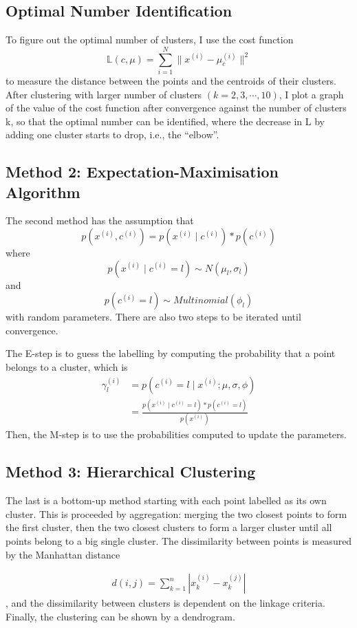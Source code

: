 \documentclass[11pt]{report}
\begin{document}
\subsection{Optimal Number Identification}
To figure out the optimal number of clusters, I use the cost function 
\[
     \mathbb{L}(c,\mu)=\sum_{i=1}^N \lVert x^{(i)}-\mu_c^{(i)}\rVert^2
\]   to measure the distance between the points and the centroids of their clusters. After clustering with larger number of clusters $(k=2,3,\cdots ,10)$,  I plot a graph of the value of the cost function after convergence against the number of clusters k, so that the optimal number can be identified, where the decrease in L by adding one cluster starts to drop, i.e., the “elbow”.

\subsection{Method 2: Expectation-Maximisation Algorithm}

The second method has the assumption that 
\[
     p(x^{(i)},c^{(i)})=p(x^{(i)}\mid c^{(i)})*p(c^{(i)}) 
\]
where 
\[
     p(x^{(i)}\mid c^{(i)}=l) \sim N(\mu_l, \sigma_l)
\] 
and 
\[
     p(c^{(i)}=l) \sim Multinomial(\phi_l ) 
\]
with random parameters. There are also two steps to be iterated until convergence. 

The E-step is to guess the labelling by computing the probability that a point belongs to a cluster, which is 
\begin{align*}
     \gamma_l^{(i)}&=p(c^{(i)}= l\mid x^{(i)} ;{\mu},{\sigma},{\phi})\\
     &=\frac{p(x^{(i)}\mid c^{(i)} = l)*p(c^{(i)}=l)}{p(x^{(i)})}
\end{align*}
Then, the M-step is to use the probabilities computed to update the parameters.

\subsection{Method 3: Hierarchical Clustering}
The last is a bottom-up method starting with each point labelled as its own cluster. This is proceeded by aggregation: merging the two closest points to form the first cluster, then the two closest clusters to form a larger cluster until all points belong to a big single cluster. The dissimilarity between points is measured by the Manhattan distance 

\begin{align*}
     d(i,j)=\sum_{k=1}^n|x_k^{(i)}-x_k^{(j)}|
\end{align*} , and the dissimilarity between clusters is dependent on the linkage criteria. Finally, the clustering can be shown by a dendrogram.
\end{document}
